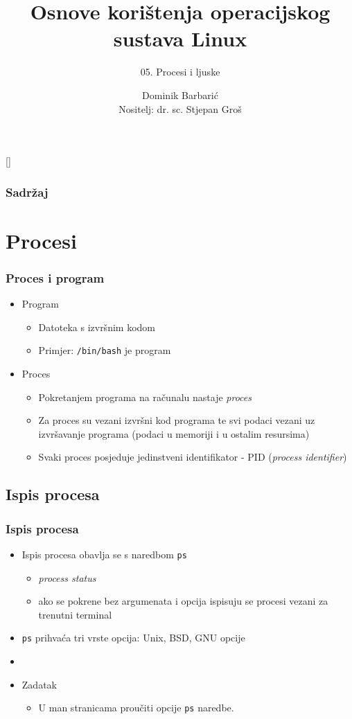 \documentclass[table,usenames,dvipsnames]{beamer}
\title{Osnove korištenja operacijskog sustava Linux}
\subtitle{05. Procesi i ljuske}
\author[Dominik Barbarić]{Dominik Barbarić\\ \small{Nositelj: dr. sc. Stjepan Groš}}
\institute[FER]{Sveučilište u Zagrebu \\
				Fakultet elektrotehnike i računarstva}
\date{\todayiso}
\newcommand{\shell}[1]{\texttt{#1}}
\begin{document}
{
[] %

\begin{frame}
\maketitle
\end{frame}
}

\begin{frame}
\frametitle{Sadržaj}
\tableofcontents
\end{frame}

\section{Procesi}
\begin{frame}[t]
\frametitle{Proces i program}
\begin{itemize}
  \item Program
  \begin{itemize}
    \item Datoteka s izvršnim kodom
    \item Primjer: \shell{/bin/bash} je program
  \end{itemize}
  \item Proces
  \begin{itemize}
    \item Pokretanjem programa na računalu nastaje \emph{proces}
    \item Za proces su vezani izvršni kod programa te svi podaci vezani uz izvršavanje programa (podaci u memoriji i u ostalim resursima)
    \item Svaki proces posjeduje jedinstveni identifikator - PID (\emph{process identifier})
  \end{itemize}
\end{itemize}
\end{frame}

\subsection{Ispis procesa}
\begin{frame}[t]
\frametitle{Ispis procesa}
\begin{itemize}
 
  \item Ispis procesa obavlja se s naredbom \shell{ps} 
  \begin{itemize}
  	\item \emph{process status}
  	\item ako se pokrene bez argumenata i opcija ispisuju se procesi vezani za trenutni terminal
  \end{itemize}
  \item \shell{ps} prihvaća tri vrste opcija: Unix, BSD, GNU opcije
  \item[]
	\item Zadatak
	\begin{itemize}
	  	\item U man stranicama proučiti opcije \shell{ps} naredbe.
  	\end{itemize}
\end{itemize}
\end{frame}
\end{document}
